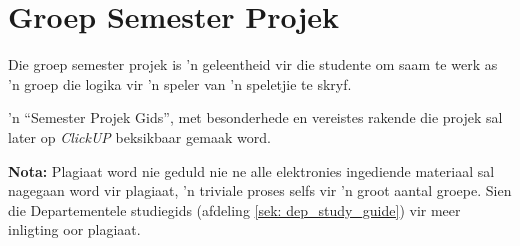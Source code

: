 \section{Groep Semester Projek}
        Die groep semester projek is 'n geleentheid vir die studente om saam te
        werk as 'n groep die logika vir 'n speler van 'n speletjie te skryf.
        
        'n ``Semester Projek Gids'', met besonderhede en vereistes rakende die projek
        sal later op \textit{ClickUP} beksikbaar gemaak word.


        \textbf{Nota:} Plagiaat word nie geduld nie ne alle
        elektronies ingediende materiaal sal nagegaan word vir
        plagiaat, 'n triviale proses selfs vir 'n groot aantal
        groepe. Sien die Departementele studiegids (afdeling
        \ref{sek: dep_study_guide}) vir meer inligting oor plagiaat. 
      
